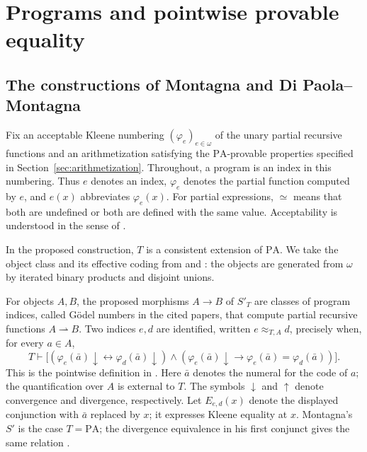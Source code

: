 \documentclass[11pt]{article}
\newcommand{\PA}{\mathrm{PA}}
\begin{document}
\section{Programs and pointwise provable equality}\label{sec:programs}

\subsection{The constructions of Montagna and Di Paola--Montagna}

Fix an acceptable Kleene numbering $(\varphi_e)_{e\in\omega}$ of the unary
partial recursive functions and an arithmetization satisfying the
$\PA$-provable properties specified in
Section~\ref{sec:arithmetization}.
Throughout, a program is an index in this
numbering. Thus $e$ denotes an index, $\varphi_e$ denotes the partial function
computed by $e$, and $e(x)$ abbreviates $\varphi_e(x)$.
For partial expressions, $\simeq$ means that both are undefined or
both are defined with the same value.
Acceptability is understood
in the sense of \cite[Definitions~II.5.1--II.5.2, p.~215]{Odifreddi}.

In the proposed construction, $T$ is a consistent extension of $\PA$.
We take the object class and its effective coding from
\cite[pp.~105--106]{Montagna} and
\cite[p.~646]{DiPaolaMontagna}: the objects are generated from
$\omega$ by iterated binary products and disjoint unions.

For objects $A,B$, the proposed morphisms $A\to B$ of $S'_T$ are
classes of program indices, called G\"odel numbers in the cited papers,
that compute partial recursive functions $A\rightharpoonup B$.
Two indices $e,d$ are identified,
written $e\approx_{T,A}d$, precisely when, for every $a\in A$,
\begin{equation*}
 T\vdash
 \bigl[(\varphi_e(\bar a)\downarrow
          \leftrightarrow\varphi_d(\bar a)\downarrow)
 \land
 (\varphi_e(\bar a)\downarrow
          \to\varphi_e(\bar a)=\varphi_d(\bar a))\bigr].
\end{equation*}
This is the pointwise definition in \cite[p.~646]{DiPaolaMontagna}.
Here $\bar a$ denotes the numeral for the code of $a$; the quantification
over $A$ is external to $T$.
The symbols $\downarrow$ and $\uparrow$ denote convergence and
divergence, respectively.
Let $E_{e,d}(x)$ denote the displayed conjunction with $\bar a$ replaced
by $x$; it expresses Kleene equality at $x$.
Montagna's $S'$ is the case $T=\PA$; the divergence equivalence in
his first conjunct gives the same relation
\cite[p.~106]{Montagna}.
\end{document}
